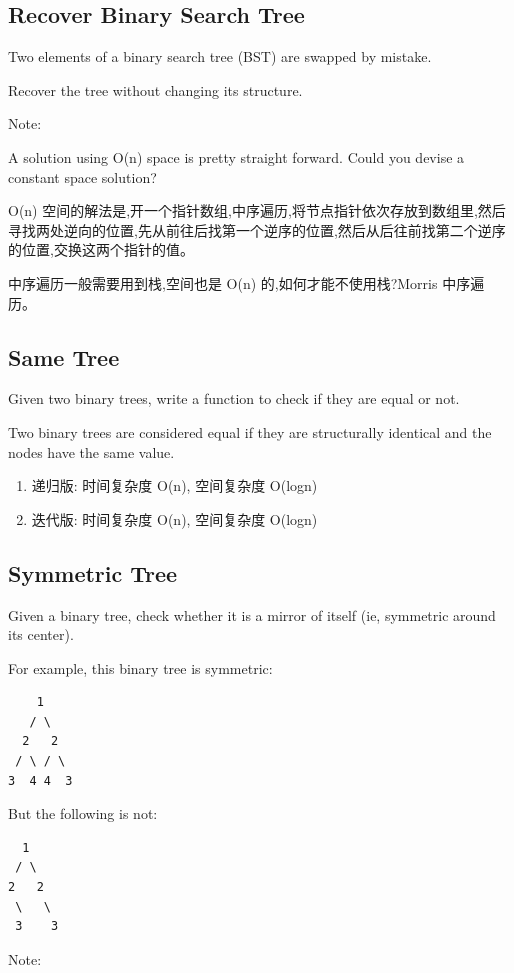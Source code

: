 \documentclass[12pt]{book}
\begin{document}
\subsection{Recover Binary Search Tree}
\label{sec-4-2-7}
Two elements of a binary search tree (BST) are swapped by mistake.

Recover the tree without changing its structure.

Note:

A solution using O(n) space is pretty straight forward. Could you devise a constant space solution?

O(n) 空间的解法是,开一个指针数组,中序遍历,将节点指针依次存放到数组里,然后寻找两处逆向的位置,先从前往后找第一个逆序的位置,然后从后往前找第二个逆序的位置,交换这两个指针的值。

中序遍历一般需要用到栈,空间也是 O(n) 的,如何才能不使用栈?Morris 中序遍历。

\subsection{Same Tree}
\label{sec-4-2-8}
Given two binary trees, write a function to check if they are equal or not.

Two binary trees are considered equal if they are structurally identical and the nodes have the same value.
\begin{enumerate}
\item 递归版: 时间复杂度 O(n), 空间复杂度 O(logn)
\label{sec-4-2-8-1}
\item 迭代版: 时间复杂度 O(n), 空间复杂度 O(logn)
\label{sec-4-2-8-2}
\end{enumerate}

\subsection{Symmetric Tree}
\label{sec-4-2-9}
Given a binary tree, check whether it is a mirror of itself (ie, symmetric around its center).

For example, this binary tree is symmetric:
\lstset{language=java,label= ,caption= ,numbers=none}
\begin{lstlisting}
    1
   / \
  2   2
 / \ / \
3  4 4  3
\end{lstlisting}
But the following is not:
\lstset{language=java,label= ,caption= ,numbers=none}
\begin{lstlisting}
  1
 / \
2   2
 \   \
 3    3
\end{lstlisting}
Note:
\end{document}
